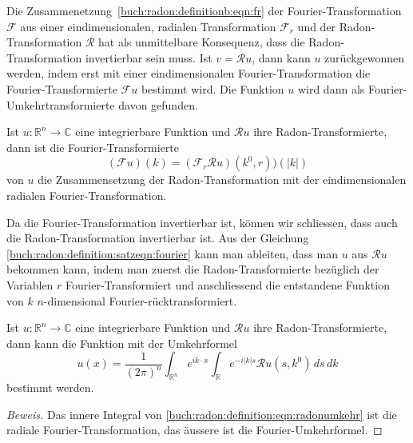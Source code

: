 Die Zusammenetzung~\eqref{buch:radon:definitionb:eqn:fr}
der Fourier-Transformation $\mathscr{F}$ aus
einer eindimensionalen, radialen Transformation $\mathscr{F}_r$ und der
Radon-Transformation $\mathscr{R}$
hat als unmittelbare Konsequenz, dass die Radon-Transformation
invertierbar sein muss.
Ist $v=\mathscr{R}u$, dann kann $u$ zurückgewonnen werden, indem
erst mit einer eindimensionalen Fourier-Transformation die
Fourier-Transformierte $\mathscr{F}u$ bestimmt wird.
Die Funktion $u$ wird dann als Fourier-Umkehrtransformierte davon
gefunden.

\begin{satz}
Ist $u\colon \mathbb{R}^n \to\mathbb{C}$ eine integrierbare Funktion
und $\mathscr{R}u$ ihre Radon-Transformierte, dann ist die
Fourier-Transformierte
\begin{equation}
(\mathscr{F}u)(k)
=
(\mathscr{F}_r \mathscr{R}u)(k^0, r))(|k|)
\label{buch:radon:definition:satzeqn:fourier}
\end{equation}
von $u$ die Zusammensetzung der Radon-Transformation mit der 
eindimensionalen radialen Fourier-Transformation.
\end{satz}

Da die Fourier-Transformation invertierbar ist, können wir schliessen,
dass auch die Radon-Transformation invertierbar ist.
Aus der Gleichung
\eqref{buch:radon:definition:satzeqn:fourier}
kann man ableiten, dass man $u$ aus $\mathscr{R}u$ bekommen kann,
indem man zuerst die Radon-Transformierte bezüglich der Variablen
$r$ Fourier-Transformiert und anschliessend die entstandene 
Funktion von $k$ $n$-dimensional Fourier-rücktransformiert.

\begin{satz}
Ist $u\colon \mathbb{R}^n\to\mathbb{C}$ eine integrierbare Funktion
und $\mathscr{R}u$ ihre Radon-Transformierte, dann kann die Funktion
mit der Umkehrformel
\begin{equation}
u(x)
=
\frac{1}{(2\pi)^n}
\int_{\mathbb{R}^n}
e^{ik\cdot x}
\int_{\mathbb{R}}
e^{-i|k|s}
\mathscr{R}u(s,k^0)
\,ds
\,dk
\label{buch:radon:definition:eqn:radonumkehr}
\end{equation}
bestimmt werden.
\end{satz}

\begin{proof}[Beweis]
Das innere Integral von \eqref{buch:radon:definition:eqn:radonumkehr}
ist die radiale Fourier-Transformation, das äussere ist die
Fourier-Umkehrformel.
\end{proof}

